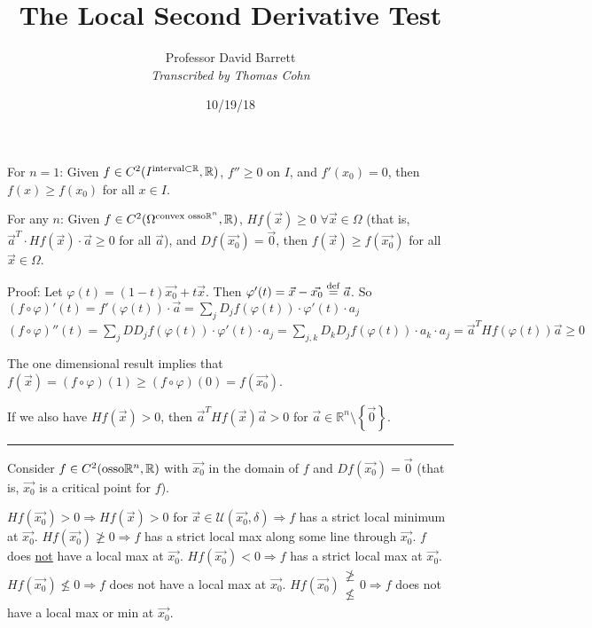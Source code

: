 \documentclass[10pt,letterpaper]{article}
\author{Professor David Barrett\\ \small\textit{Transcribed by Thomas Cohn}}
\title{The Local Second Derivative Test}
\date{10/19/18} %
\newcommand{\n}{\hfill\break}
\newcommand{\ptxt}[1]{\textrm{\textnormal{#1}}}
\newcommand{\pageline}{\noindent\rule{\textwidth}{0.1pt}}
\newcommand{\set}[1]{\left\{#1\right\}}
\newcommand{\reals}{\mathbb{R}}
\newcommand{\R}{\reals}
\newcommand{\of}{\circ}
\newcommand{\tpose}{^{T}}
\newcommand{\uball}{\mathcal{U}}
\begin{document}
\maketitle
\setlength\RaggedRightParindent{\parindent}
\RaggedRight

\par\noindent For $n=1$: Given $f\in{}C^{2}(I^{\ptxt{interval}\subset\R},\R)$, $f''\ge{}0$ on $I$, and $f'(x_{0})=0$, then $f(x)\ge{}f(x_{0})$ for all $x\in{}I$.\n

\par\noindent For any $n$: Given $f\in{}C^{2}(\Omega^{\ptxt{convex osso}\R^{n}},\R)$, $Hf(\vec{x})\ge{}0$ $\forall\vec{x}\in\Omega$ (that is, $\vec{a}\tpose\cdot{}Hf(\vec{x})\cdot\vec{a}\ge{}0$ for all $\vec{a}$), and $Df(\vec{x_{0}})=\vec{0}$, then $f(\vec{x})\ge{}f(\vec{x_{0}})$ for all $\vec{x}\in\Omega$.\n

\par\noindent Proof: Let $\varphi(t)=(1-t)\vec{x_{0}}+t\vec{x}$. Then $\varphi'(t)=\vec{x}-\vec{x_{0}}\overset{\ptxt{def}}{=}\vec{a}$.\n
So $(f\of\varphi)'(t)=f'(\varphi(t))\cdot\vec{a}=\sum_{j}D_{j}f(\varphi(t))\cdot\varphi'(t)\cdot{}a_{j}$\n
$(f\of\varphi)''(t)=\sum_{j}DD_{j}f(\varphi(t))\cdot\varphi'(t)\cdot{}a_{j}=\sum_{j,k}D_{k}D_{j}f(\varphi(t))\cdot{}a_{k}\cdot{}a_{j}=\vec{a}\tpose{}Hf(\varphi(t))\vec{a}\ge{}0$\n

\par\noindent The one dimensional result implies that $f(\vec{x})=(f\of\varphi)(1)\ge(f\of\varphi)(0)=f(\vec{x_{0}})$.\n

\par\noindent If we also have $Hf(\vec{x})>0$, then $\vec{a}\tpose{}Hf(\vec{x})\vec{a}>0$ for $\vec{a}\in\R^{n}\setminus\set{\vec{0}}$.\n

\pageline

\par\noindent Consider $f\in{}C^{2}(\ptxt{osso}\R^{n},\R)$ with $\vec{x_{0}}$ in the domain of $f$ and $Df(\vec{x_{0}})=\vec{0}$ (that is, $\vec{x_{0}}$ is a critical point for $f$).\n

\par\noindent $Hf(\vec{x_{0}})>0\Rightarrow{}Hf(\vec{x})>0$ for $\vec{x}\in\uball(\vec{x_{0}},\delta)\Rightarrow{}f$ has a strict local minimum at $\vec{x_{0}}$.\n
$Hf(\vec{x_{0}})\not\ge{}0\Rightarrow{}f$ has a strict local max along some line through $\vec{x_{0}}$. $f$ does \underline{not} have a local max at $\vec{x_{0}}$.\n
$Hf(\vec{x_{0}})<0\Rightarrow{}f$ has a strict local max at $\vec{x_{0}}$.\n
$Hf(\vec{x_{0}})\not\le{}0\Rightarrow{}f$ does not have a local max at $\vec{x_{0}}$.\n
$Hf(\vec{x_{0}})\begin{array}{c}\not\ge\\ \not\le\end{array}0\Rightarrow{}f$ does not have a local max or min at $\vec{x_{0}}$.\n
\end{document}

